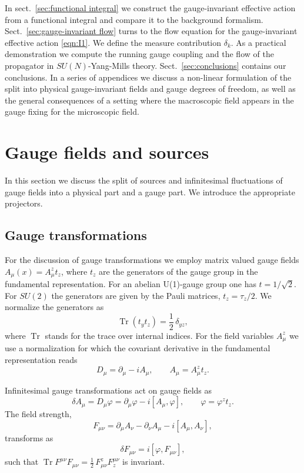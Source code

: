 \documentclass[twocolumn,aps,prd,amsmath,amssymb,preprintnumbers,longbibliography]{revtex4-1}
\numberwithin{equation}{section}
\DeclareMathOperator{\Tr}{Tr}
\begin{document}
In sect.~\ref{sec:functional integral} we construct the gauge-invariant effective action from a functional integral and compare it to the background formalism. Sect.~\ref{sec:gauge-invariant flow} turns to the flow equation for the gauge-invariant effective action \eqref{eqn:I1}. We define the measure contribution $\delta_k$. As a practical demonstration we compute the running gauge coupling and the flow of the propagator in $SU(N)$-Yang-Mills theory. Sect.~\ref{sec:conclusions} contains our conclusions. In a series of appendices we discuss a non-linear formulation of the split into physical gauge-invariant fields and gauge degrees of freedom, as well as the general consequences of a setting where the macroscopic field appears in the gauge fixing for the microscopic field.



\section{Gauge fields and sources}
\label{sec:gauge fields sources}

In this section we discuss the split of sources and infinitesimal fluctuations of gauge fields into a physical part and a gauge part. We introduce the appropriate projectors.


\subsection{Gauge transformations}

For the discussion of gauge transformations we employ matrix valued gauge fields $A_\mu\left( x \right) = A_\mu^z t_z$, where $t_z$ are the generators of the gauge group in the fundamental representation. For an abelian U(1)-gauge group one has $t = 1/\sqrt{2}$. For $SU(2)$ the generators are given by the Pauli matrices, $t_z = \tau_z/2$. We normalize the generators as
\begin{equation}\label{eqn:GA}
	\Tr(t_y t_z)
	= \frac{1}{2} \, \delta_{yz},
\end{equation}
where $\Tr$ stands for the trace over internal indices. For the field variables $A^z_\mu$ we use a normalization for which the covariant derivative in the fundamental representation reads
\begin{equation}\label{eqn:GB}
	D_\mu
	= \partial_\mu - i A_\mu,
	\qquad
	A_\mu
	= A^z_\mu t_z.
\end{equation}

Infinitesimal gauge transformations act on gauge fields as
\begin{equation}\label{eqn:G1}
	\delta A_\mu
	= D_\mu \varphi
	= \partial_\mu \varphi - i [A_\mu,\varphi],
	\qquad
	\varphi
	= \varphi^z t_z.
\end{equation}
The field strength,
\begin{equation}\label{eqn:G2}
	F_{\mu\nu}
	= \partial_\mu A_\nu - \partial_\nu A_\mu - i [A_\mu,A_\nu],
\end{equation}
transforms as
\begin{equation}\label{eqn:G3}
	\delta F_{\mu\nu}
	= i [\varphi,F_{\mu\nu}],
\end{equation}
such that $\Tr F^{\mu\nu} F_{\mu\nu} = \frac{1}{2} \, F^z_{\mu\nu}F_z^{\mu\nu}$ is invariant.
\end{document}
